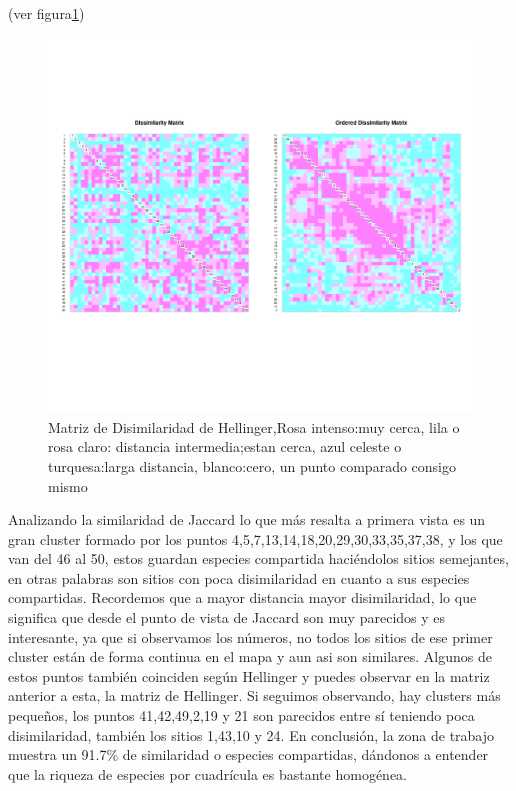 \documentclass[11pt,]{article}
\begin{document}
(ver figura\ref{fig:diss_hellinger})

\begin{figure}
\centering
\includegraphics{diss_hellinger.png}
\caption{\label{fig:diss_hellinger}Matriz de Disimilaridad de
Hellinger,Rosa intenso:muy cerca, lila o rosa claro: distancia
intermedia;estan cerca, azul celeste o turquesa:larga distancia,
blanco:cero, un punto comparado consigo mismo}
\end{figure}

Analizando la similaridad de Jaccard lo que más resalta a primera vista
es un gran cluster formado por los puntos
4,5,7,13,14,18,20,29,30,33,35,37,38, y los que van del 46 al 50, estos
guardan especies compartida haciéndolos sitios semejantes, en otras
palabras son sitios con poca disimilaridad en cuanto a sus especies
compartidas. Recordemos que a mayor distancia mayor disimilaridad, lo
que significa que desde el punto de vista de Jaccard son muy parecidos y
es interesante, ya que si observamos los números, no todos los sitios de
ese primer cluster están de forma continua en el mapa y aun asi son
similares. Algunos de estos puntos también coinciden según Hellinger y
puedes observar en la matriz anterior a esta, la matriz de Hellinger. Si
seguimos observando, hay clusters más pequeños, los puntos 41,42,49,2,19
y 21 son parecidos entre sí teniendo poca disimilaridad, también los
sitios 1,43,10 y 24. En conclusión, la zona de trabajo muestra un 91.7\%
de similaridad o especies compartidas, dándonos a entender que la
riqueza de especies por cuadrícula es bastante homogénea.
\end{document}

